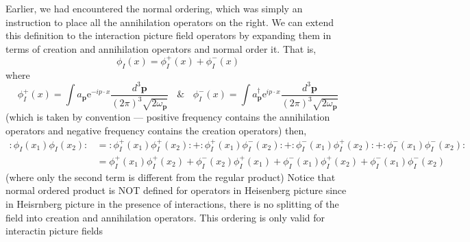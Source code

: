 \documentclass[11pt, notitlepage]{report}
\newcommand{\e}{\mathrm{e}}
\newcommand{\w}{\omega}
\newcommand{\normord}[1]{:\mathrel{#1}:}
\renewcommand{\a}[1]{a_\mathbf{#1}}
\newcommand{\adag}[1]{a^\dagger_\mathbf{#1}}
\numberwithin{equation}{section}
\begin{document}
    Earlier, we had encountered the normal ordering, which was simply an instruction to place all the annihilation operators on the right. We can extend this definition to the interaction picture field operators by expanding them in terms of creation and annihilation operators and normal order it. That is, 
    \begin{equation*}
        \phi_I(x) = \phi_I^+(x) + \phi_I^-(x)
    \end{equation*}
    where 
    \begin{equation*}
        \phi_I^+(x) = \int \a{p}\e^{-ip\cdot x} \frac{d^3\textbf{p}}{(2\pi)^3 \sqrt{2\w_\textbf{p}}}~~~~\&~~~~\phi_I^-(x) = \int \adag{p}\e^{ip\cdot x} \frac{d^3\textbf{p}}{(2\pi)^3 \sqrt{2\w_\textbf{p}}}
    \end{equation*}
    (which is taken by convention — positive frequency contains the annihilation operators and negative frequency contains the creation operators) then, 
    \begin{align*}
        \normord{\phi_I(x_1) \phi_I(x_2)} &= \normord{\phi_I^+(x_1)\phi_I^+(x_2)} + \normord{\phi_I^+(x_1)\phi_I^-(x_2)} + \normord{\phi_I^-(x_1)\phi_I^+(x_2)} + \normord{\phi_I^-(x_1)\phi_I^-(x_2)}\\
        &= \phi_I^+(x_1)\phi_I^+(x_2) + \phi_I^-(x_2)\phi_I^+(x_1) + \phi_I^-(x_1)\phi_I^+(x_2) + \phi_I^-(x_1)\phi_I^-(x_2)
    \end{align*}
    (where only the second term is different from the regular product)
    Notice that normal ordered product is NOT defined for operators in Heisenberg picture since in Heisrnberg picture in the presence of interactions, there is no splitting of the field into creation and annihilation operators. This ordering is only valid for interactin picture fields\\
\end{document}
